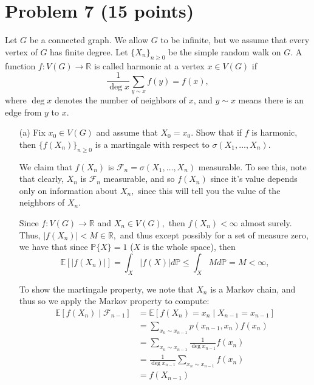 \documentclass[11pt]{article}
\newcommand{\bbE}{\mathbb{E}}
\newcommand{\bbP}{\mathbb{P}}
\newcommand{\bbR}{\mathbb{R}}
\begin{document}
\newpage

\section*{Problem 7 (15 points)}
Let \(G\) be a connected graph. We allow \(G\) to be infinite, but we assume that every vertex of \(G\) has finite degree. Let \(\{X_n\}_{n \geq 0}\) be the simple random walk on \(G\). A function \(f : V(G) \to \mathbb{R}\) is called harmonic at a vertex \(x \in V(G)\) if
\[
\frac{1}{\deg x} \sum_{y \sim x} f(y) = f(x),
\]
where \(\deg x\) denotes the number of neighbors of \(x\), and \(y \sim x\) means there is an edge from \(y\) to \(x\).

\begin{itemize}
    \item[(a)] Fix \(x_0 \in V(G)\) and assume that \(X_0 = x_0\). Show that if \(f\) is harmonic, then \(\{f(X_n)\}_{n \geq 0}\) is a martingale with respect to \(\sigma(X_1, \ldots, X_n)\).
\begin{solution}
We claim that $f(X_n)$ is $\mathcal{F}_n = \sigma(X_1, \dots, X_n)$ measurable. To see this, note that clearly, $X_n$ is $\mathcal{F}_n$ measurable, and so  $f(X_n)$ since it's value depends only on information about $X_n,$ since this will tell you the value of the neighbors of $X_n.$ 

Since $f: V(G)\to \bbR$ and $X_n \in V(G),$ then $f(X_n) < \infty$ almost surely. Thus, $|f(X_n)| < M \in \bbR,$ and thus except possibly for a set of measure zero, we have that since $\bbP\{X\}= 1$ ($X$ is the whole space), then 
\[\bbE[|f(X_n)|]=\int_X |f(X)|d\bbP \leq \int_X M d\bbP = M < \infty,\]

To show the martingale property, we note that $X_n$ is a Markov chain, and thus so we apply the Markov property to compute:
\begin{align*}
\bbE[f(X_n) \mid \mathcal{F}_{n-1}] &= \bbE[f(X_n)  = x_n\mid X_{n-1}= x_{n-1}]\\
&= \sum_{x_n \sim x_{n-1}} p(x_{n-1}, x_n)f(x_n)\\
&= \sum_{x_n \sim x_{n-1}} \frac{1}{\deg x_{n-1}} f(x_n)\\
&= \frac{1}{\deg x_{n-1}} \sum_{x_n \sim x_{n-1}} f(x_n)\\
&= f(X_{n-1})
\end{align*}
 



\end{solution}
\end{itemize}
\end{document}
